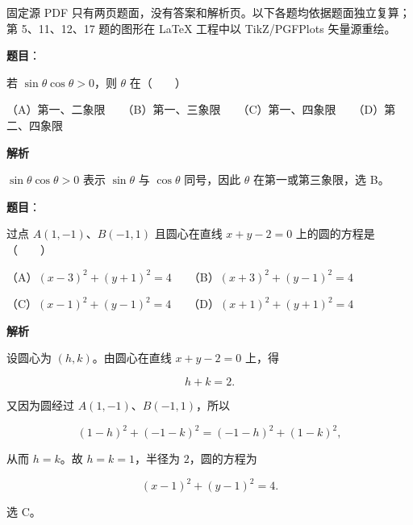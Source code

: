 

\begin{gktip}
固定源 PDF 只有两页题面，没有答案和解析页。以下各题均依据题面独立复算；第 5、11、12、17 题的图形在 LaTeX 工程中以 TikZ/PGFPlots 矢量源重绘。
\end{gktip}


\begin{answer}

\textbf{题目}：

若 $\sin\theta\cos\theta>0$，则 $\theta$ 在\mbox{（　　）}

（A）第一、二象限　　（B）第一、三象限　　（C）第一、四象限　　（D）第二、四象限

\textbf{解析}

$\sin\theta\cos\theta>0$ 表示 $\sin\theta$ 与 $\cos\theta$ 同号，因此 $\theta$ 在第一或第三象限，选 B。


\end{answer}
\begin{answer}

\textbf{题目}：

过点 $A(1,-1)$、$B(-1,1)$ 且圆心在直线 $x+y-2=0$ 上的圆的方程是\mbox{（　　）}

（A）$(x-3)^2+(y+1)^2=4$　　（B）$(x+3)^2+(y-1)^2=4$

（C）$(x-1)^2+(y-1)^2=4$　　（D）$(x+1)^2+(y+1)^2=4$

\textbf{解析}

设圆心为 $(h,k)$。由圆心在直线 $x+y-2=0$ 上，得

\nopagebreak[4]
\[
h+k=2.
\]

又因为圆经过 $A(1,-1)$、$B(-1,1)$，所以

\nopagebreak[4]
\[
(1-h)^2+(-1-k)^2=(-1-h)^2+(1-k)^2,
\]

从而 $h=k$。故 $h=k=1$，半径为 $2$，圆的方程为

\nopagebreak[4]
\[
(x-1)^2+(y-1)^2=4.
\]

选 C。


\end{answer}
